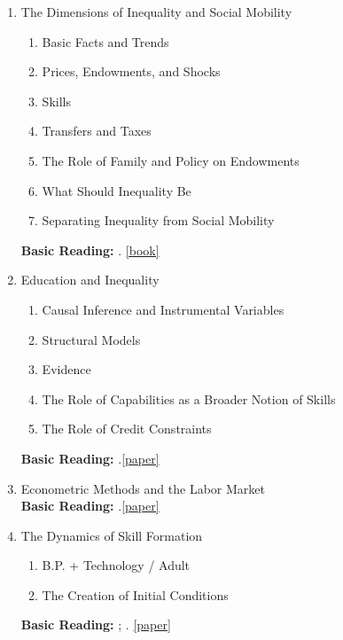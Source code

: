 \documentclass[12pt]{article}
\begin{document}
\begin{enumerate}
\item The Dimensions of Inequality and Social Mobility
\begin{enumerate}
\item Basic Facts and Trends
\item Prices, Endowments, and Shocks
\item Skills
\item Transfers and Taxes
\item The Role of Family and Policy on Endowments
\item What Should Inequality Be
\item Separating Inequality from Social Mobility
\end{enumerate}
\textbf{Basic Reading:} \citet{oecd2011divided}. \href{http://www.oecd-ilibrary.org.proxy.uchicago.edu/social-issues-migration-health/the-causes-of-growing-inequalities-in-oecd-countries_9789264119536-en}{[book]}
\item Education and Inequality
\begin{enumerate}
\item Causal Inference and Instrumental Variables
\item Structural Models
\item Evidence
\item The Role of Capabilities as a Broader Notion of Skills
\item The Role of Credit Constraints
\end{enumerate}
\textbf{Basic Reading:} \citet{heckman2006earnings}.\href{http://ac.els-cdn.com/S1574069206010075/1-s2.0-S1574069206010075-main.pdf?_tid=933794d0-71b0-11e3-aa29-00000aacb35f&acdnat=1388449075_10ef0d45d8d0cf4af1dcb457126446ef}{[paper]}
\item Econometric Methods and the Labor Market\\
\textbf{Basic Reading:} \citet{french2011identification}.\href{http://ac.els-cdn.com/S0169721811004126/1-s2.0-S0169721811004126-main.pdf?_tid=5c1fc58a-71b0-11e3-abd1-00000aacb35d&acdnat=1388448982_31987ea801c83e7a679f998764956494}{[paper]}
\item The Dynamics of Skill Formation
\begin{enumerate}
\item B.P. + Technology / Adult
\item The Creation of Initial Conditions
\end{enumerate}
\textbf{Basic Reading:} \citet{mosso2014}; \citet{rubinstein2006post}. \href{http://ac.els-cdn.com/S1574069206010014/1-s2.0-S1574069206010014-main.pdf?_tid=14c8b0d4-71b0-11e3-835f-00000aacb361&acdnat=1388448862_61742534f589f0adf0c69e5ada20db05}{[paper]}

\end{enumerate}
\end{document}
